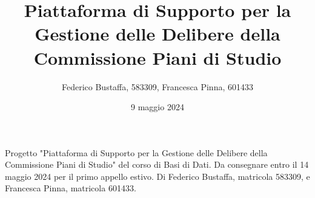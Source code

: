 \documentclass[12pt]{article}
\title{Piattaforma di Supporto per la Gestione delle Delibere 
della Commissione Piani di Studio}
\author{Federico Bustaffa, 583309, Francesca Pinna, 601433}
\date{9 maggio 2024}
\begin{document}
\maketitle

Progetto "Piattaforma di Supporto per la Gestione delle Delibere
della Commissione Piani di Studio" del corso di Basi di Dati.
Da consegnare entro il 14 maggio 2024 per il primo appello
estivo. Di Federico Bustaffa, matricola 583309, e Francesca
Pinna, matricola 601433.






\end{document}
